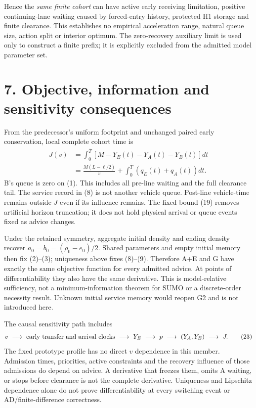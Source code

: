 \documentclass[11pt,a4paper]{article}
\begin{document}
Hence the \emph{same finite cohort} can have active early receiving
limitation, positive continuing-lane waiting caused by forced-entry history,
protected H1 storage and finite clearance. This establishes no empirical
acceleration range, natural queue size, action split or interior optimum.
The zero-recovery auxiliary limit is used only to construct a finite prefix;
it is explicitly excluded from the admitted model parameter set.

\newpage
\section*{7. Objective, information and sensitivity consequences}

From the predecessor's uniform footprint and unchanged paired early
conservation, local complete cohort time is
\begin{align}
 J(v)&=\int_0^{\overline T}\left[M-Y_E(t)-Y_A(t)-Y_B(t)\right]dt\nonumber\\
 &=\frac{M(L-\ell/2)}{v}
   +\int_0^{\overline T}(q_E(t)+q_A(t))dt.
 \tag{22}
\end{align}
B's queue is zero on (1). This includes all pre-line waiting and the full
clearance tail. The service record in (8) is not another vehicle queue.
Post-line vehicle-time remains outside $J$ even if its influence remains.
The fixed bound (19) removes artificial horizon truncation; it does not
hold physical arrival or queue events fixed as advice changes.

Under the retained symmetry, aggregate initial density and ending density
recover $a_0=b_0=(\rho_0-e_0)/2$. Shared parameters and empty initial memory
then fix (2)--(3); uniqueness above fixes (8)--(9). Therefore A+E and G
have exactly the same objective function for every admitted advice.
At points of differentiability they also have the same derivative.
This is model-relative sufficiency, not a minimum-information theorem for
SUMO or a discrete-order necessity result. Unknown initial service memory
would reopen G2 and is not introduced here.

The causal sensitivity path includes
\begin{equation}
 v\ \longrightarrow\ \hbox{early transfer and arrival clocks}
 \ \longrightarrow\ Y_E\ \longrightarrow\ p
 \ \longrightarrow\ (Y_A,Y_E)\ \longrightarrow\ J.
 \tag{23}
\end{equation}
The fixed prototype profile has no direct $v$ dependence in this member.
Admission times, priorities, active constraints and the recovery influence
of those admissions do depend on advice. A derivative that freezes them,
omits A waiting, or stops before clearance is not the complete derivative.
Uniqueness and Lipschitz dependence alone do not prove differentiability
at every switching event or AD/finite-difference correctness.
\end{document}
